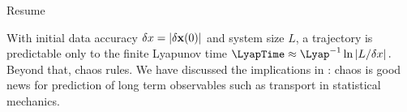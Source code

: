 {%
%
%

}%


Resume


\noindent
With initial data accuracy $\delta x = |\delta {\bf x}(0)| $ and
system size $L$, a trajectory is predictable only to the finite
Lyapunov time $ \LyapTime \approx {\Lyap}^{-1}\ln {|L / \delta x|} \,.
$ %
Beyond that, chaos rules. We have discussed the implications in
: chaos is good news for prediction of long term
observables such as transport in statistical mechanics.


